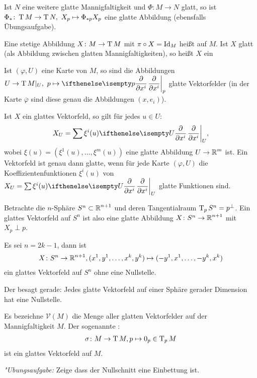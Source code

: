Ist $N$ eine weitere glatte Mannigfaltigkeit und $\Phi \colon M \to N$ glatt, so ist $\Phi_{*} \colon \operatorname{T} M \to \operatorname{T} N, \ X_p \mapsto \Phi_{*p}X_p$ eine glatte Abbildung (ebensfalls Übungsaufgabe).

\begin{dfn}
  Eine stetige Abbildung $X \colon M \to \operatorname{T} M$ mit $\pi \circ X = \operatorname{Id}_M$ heißt  auf $M$.
  Ist $X$ glatt (als Abbildung zwischen glatten Mannigfaltigkeiten), so heißt $X$ ein 
\end{dfn}

\begin{bem}
  Ist $(\varphi, U)$ eine Karte von $M$, so sind die Abbildungen $U \to \T M|_U, \ p \mapsto \pdifffrac[p]{}{x^{i}}$ glatte Vektorfelder (in der Karte $\overline \varphi$ sind diese genau die Abbildungen $(x,e_i)$).
  
  Ist $X$ ein glattes Vektorfeld, so gilt für jedes $u \in U$:
  \begin{align*}
    X_U = \sum \xi^i(u) \pdifffrac[U]{}{x^i},
  \end{align*}
  wobei $\xi(u) = (\xi^1(u), \ldots, \xi^m(u))$ eine glatte Abbildung $U \to \operatorname{\mathbb{R}}^m$ ist. Ein Vektorfeld ist genau dann glatte, wenn für jede Karte $(\varphi, U)$ die Koeffizientenfunktionen $\xi^i(u)$ von $X_U = \sum \xi^i(u) \pdifffrac[U]{}{x^i}$ glatte Funktionen sind.
\end{bem}



\begin{bsp*}
  Betrachte die $n$-Sphäre $S^n \subset \operatorname{\mathbb{R}}^{n+1}$ und deren Tangentialraum $\operatorname{T}_pS^n = p^{\perp}$.
  Ein glattes Vektorfeld auf $S^n$ ist also eine glatte Abbildung $X \colon S^n \to \operatorname{\mathbb{R}}^{n+1}$ mit $X_p \perp p$.
  
  Es sei $n=2k-1$, dann ist
  \begin{align*}
    X \colon S^n \to \operatorname{\mathbb{R}}^{n+1}, (x^1,y^1, \ldots, x^k,y^k) \mapsto (-y^1,x^1, \ldots, -y^k,x^k)
  \end{align*}
  ein glattes Vektorfeld auf $S^n$ ohne eine Nullstelle.
\end{bsp*}

\begin{bem*}
  Der  besagt gerade: Jedes glatte Vektorfeld auf einer Sphäre gerader Dimension hat eine Nullstelle.
\end{bem*}

\begin{bem*}
  Es bezeichne $\mathcal V(M)$ die Menge aller glatten Vektorfelder auf der Mannigfaltigkeit $M$. Der sogenannte :
  \begin{align*}
    \sigma \colon M \to \operatorname{T} M, p \mapsto 0_p \in \operatorname{T}_pM
  \end{align*}
  ist ein glattes Vektorfeld auf $M$.
  
  \emph{"Ubungsaufgabe:} Zeige dass der Nullschnitt eine Einbettung ist.
\end{bem*}

